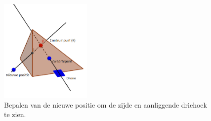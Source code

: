 \\
\begin{figure}[H]
\centering
	\includegraphics[width=0.4\textwidth]{Scannen/FigStrategieScan.png}
	\caption{Bepalen van de nieuwe positie om de zijde en aanliggende driehoek te zien.}
    \label{fig:ScanFly}
\end{figure}